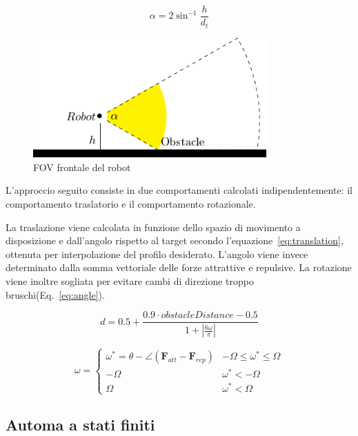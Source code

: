 \documentclass[a4paper]{article}
\begin{document}
	\begin{equation}\label{eq:obstacle_fov}
		\alpha = {2}\sin^{-1}{\frac{h}{d_t}}
	\end{equation}

	\begin{figure}[H]
		\centering
		\includegraphics[width=0.8\textwidth]{./img/obstacle_fov.pdf}
		\caption{FOV frontale del robot}
		\label{fig:obstacle_fov}
	\end{figure}

	L'approccio seguito consiste in due comportamenti calcolati
	indipendentemente: il comportamento traslatorio e il comportamento
	rotazionale.

	La traslazione viene calcolata in funzione dello spazio di movimento a
	disposizione e dall'angolo rispetto al target secondo
	l'equazione~\ref{eq:translation}, ottenuta per interpolazione del profilo
	desiderato. L'angolo viene invece determinato dalla somma vettoriale delle
	forze attrattive e repulsive. La rotazione viene inoltre sogliata per
	evitare cambi di direzione troppo bruschi(Eq.~\ref{eq:angle}).

	\begin{equation}\label{eq:translation}
		d = 0.5 + \frac	{0.9\cdot obstacleDistance - 0.5}
		{1 + \left|
				\frac{6\omega}{\pi}
		\right|  } 
	\end{equation}
	
	\begin{equation}\label{eq:angle}
		\omega = \begin{cases}
			\omega^*=\theta - \angle\left( \textbf{F}_{att} - \textbf{F}_{rep} \right)  & -\Omega \le \omega^* \le \Omega \\
			-\Omega & \omega^* < -\Omega \\
			\Omega & \omega^* < \Omega

		\end{cases}	\end{equation}
	
	\subsection{Automa a stati finiti}\label{subsec:Pianificazione}
	
\end{document}
